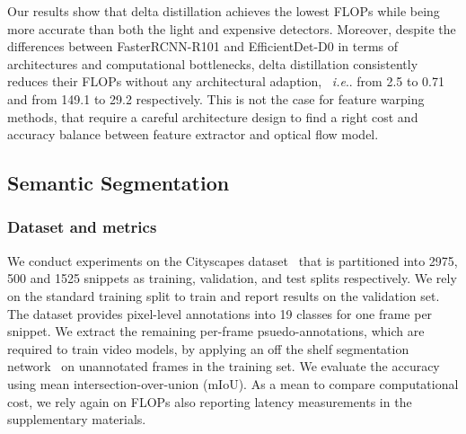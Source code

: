 \documentclass[runningheads]{llncs}
\makeatletter
\DeclareRobustCommand\onedot{\futurelet\@let@token\@onedot}
\def\@onedot{\ifx\@let@token.\else.\null\fi\xspace}
\def\ie{\emph{i.e}\onedot} \def\Ie{\emph{I.e}\onedot}
\makeatother
\begin{document}
Our results show that delta distillation achieves the lowest FLOPs while being more accurate than both the light and expensive detectors.
Moreover, despite the differences between FasterRCNN-R101 and EfficientDet-D0 in terms of architectures and computational bottlenecks, delta distillation consistently reduces their FLOPs without any architectural adaption, ~\ie from 2.5 to 0.71 and from 149.1 to 29.2 respectively. This is not the case for feature warping methods, that require a careful architecture design to find a right cost and accuracy balance between feature extractor and optical flow model. \subsection{Semantic Segmentation}
\label{sec:exp_segmentation}
\subsubsection{Dataset and metrics}
We conduct experiments on the Cityscapes dataset~\cite{cityscapes} that is partitioned into 2975, 500 and 1525 snippets as training, validation, and test splits respectively.
We rely on the standard training split to train and report results on the validation set.
The dataset provides pixel-level annotations into 19 classes for one frame per snippet.
We extract the remaining per-frame psuedo-annotations, which are required to train video models, by applying an off the shelf segmentation network~\cite{tao2020hierarchical} on unannotated frames in the training set.
We evaluate the accuracy using mean intersection-over-union (mIoU).
As a mean to compare computational cost, we rely again on FLOPs also reporting latency measurements in the supplementary materials.
\end{document}
